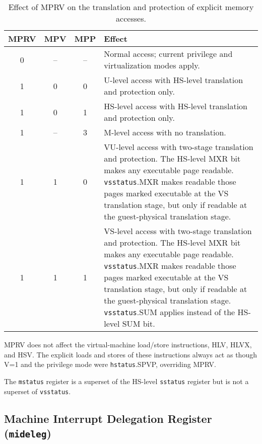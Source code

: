 \begin{table*}[h!]
\begin{center}
\begin{tabular}{|c|c|c||p{4.5in}|}
  \hline
   MPRV & MPV & MPP & Effect \\ \hline \hline
   0    & --  & --  & Normal access; current privilege and virtualization modes apply. \\ \hline
   1    & 0   & 0   & U-level access with HS-level translation and protection only. \\ \hline
   1    & 0   & 1   & HS-level access with HS-level translation and protection only.  \\ \hline
   1    & --  & 3   & M-level access with no translation. \\ \hline
   1    & 1   & 0   & VU-level access with two-stage translation and protection. The HS-level MXR bit makes any executable page readable.  {\tt vsstatus}.MXR makes readable those pages marked executable at the VS translation stage, but only if readable at the guest-physical translation stage. \\ \hline
   1    & 1   & 1   & VS-level access with two-stage translation and protection. The HS-level MXR bit makes any executable page readable.  {\tt vsstatus}.MXR makes readable those pages marked executable at the VS translation stage, but only if readable at the guest-physical translation stage.  {\tt vsstatus}.SUM applies instead of the HS-level SUM bit. \\ \hline
 \end{tabular}
\end{center}
\caption{Effect of MPRV on the translation and protection of explicit
memory accesses.}
\label{h-mprv}
\end{table*}

MPRV does not affect the virtual-machine load/store instructions, HLV,
HLVX, and HSV.
The explicit loads and stores of these instructions always act as though
V=1 and the privilege mode were {\tt hstatus}.SPVP, overriding MPRV.

The {\tt mstatus} register is a superset of the HS-level {\tt sstatus}
register but is not a superset of {\tt vsstatus}.

\FloatBarrier

\subsection{Machine Interrupt Delegation Register ({\tt mideleg})}

